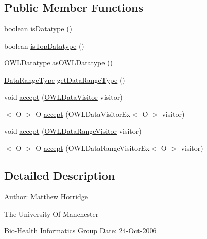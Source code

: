 \subsection*{Public Member Functions}
\begin{DoxyCompactItemize}
\item 
boolean \hyperlink{interfaceorg_1_1semanticweb_1_1owlapi_1_1model_1_1_o_w_l_data_range_aa4d41bc7c43efc499f086b6e0f90b1e0}{is\-Datatype} ()
\item 
boolean \hyperlink{interfaceorg_1_1semanticweb_1_1owlapi_1_1model_1_1_o_w_l_data_range_aec7bb1cb42b7d8783e0410112734aa1c}{is\-Top\-Datatype} ()
\item 
\hyperlink{interfaceorg_1_1semanticweb_1_1owlapi_1_1model_1_1_o_w_l_datatype}{O\-W\-L\-Datatype} \hyperlink{interfaceorg_1_1semanticweb_1_1owlapi_1_1model_1_1_o_w_l_data_range_af198d427cacd722a6d742cf9aab0f95b}{as\-O\-W\-L\-Datatype} ()
\item 
\hyperlink{enumorg_1_1semanticweb_1_1owlapi_1_1model_1_1_data_range_type}{Data\-Range\-Type} \hyperlink{interfaceorg_1_1semanticweb_1_1owlapi_1_1model_1_1_o_w_l_data_range_abaf13feb459a14cb55f9749191380b90}{get\-Data\-Range\-Type} ()
\item 
void \hyperlink{interfaceorg_1_1semanticweb_1_1owlapi_1_1model_1_1_o_w_l_data_range_a7ecc1e6c69e17c223f573548ff6970ad}{accept} (\hyperlink{interfaceorg_1_1semanticweb_1_1owlapi_1_1model_1_1_o_w_l_data_visitor}{O\-W\-L\-Data\-Visitor} visitor)
\item 
$<$ O $>$ O \hyperlink{interfaceorg_1_1semanticweb_1_1owlapi_1_1model_1_1_o_w_l_data_range_ad71972d3e5c7deae943e59580b83f5aa}{accept} (O\-W\-L\-Data\-Visitor\-Ex$<$ O $>$ visitor)
\item 
void \hyperlink{interfaceorg_1_1semanticweb_1_1owlapi_1_1model_1_1_o_w_l_data_range_aa7c461e477b19ee5ee401ce257de08eb}{accept} (\hyperlink{interfaceorg_1_1semanticweb_1_1owlapi_1_1model_1_1_o_w_l_data_range_visitor}{O\-W\-L\-Data\-Range\-Visitor} visitor)
\item 
$<$ O $>$ O \hyperlink{interfaceorg_1_1semanticweb_1_1owlapi_1_1model_1_1_o_w_l_data_range_ac83ef2431f8f7b7a83cc274e98954bec}{accept} (O\-W\-L\-Data\-Range\-Visitor\-Ex$<$ O $>$ visitor)
\end{DoxyCompactItemize}


\subsection{Detailed Description}
Author\-: Matthew Horridge\par
 The University Of Manchester\par
 Bio-\/\-Health Informatics Group Date\-: 24-\/\-Oct-\/2006 

